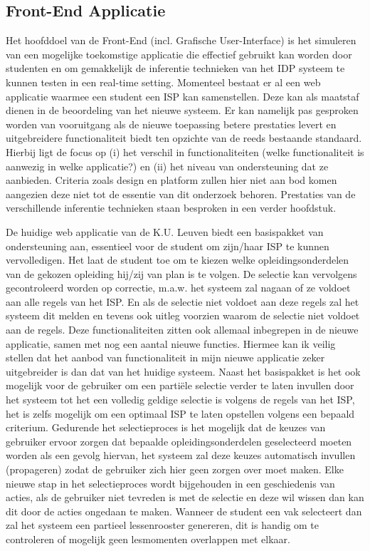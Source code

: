 \subsection{Front-End Applicatie} 
Het hoofddoel van de Front-End (incl. Grafische User-Interface) is het simuleren van een mogelijke toekomstige applicatie die effectief gebruikt kan worden door studenten en om gemakkelijk de inferentie technieken van het IDP systeem te kunnen testen in een real-time setting. Momenteel bestaat er al een web applicatie waarmee een student een ISP kan samenstellen. Deze kan als maatstaf dienen in de beoordeling van het nieuwe systeem. Er kan namelijk pas gesproken worden van vooruitgang als de nieuwe toepassing betere prestaties levert en uitgebreidere functionaliteit biedt ten opzichte van de reeds bestaande standaard. Hierbij ligt de focus op (i) het verschil in functionaliteiten (welke functionaliteit is aanwezig in welke applicatie?) en (ii) het niveau van ondersteuning dat ze aanbieden. Criteria zoals design en platform zullen hier niet aan bod komen aangezien deze niet tot de essentie van dit onderzoek behoren. Prestaties van de verschillende inferentie technieken staan besproken in een verder hoofdstuk. 

De huidige web applicatie van de K.U. Leuven biedt een basispakket van ondersteuning aan, essentieel voor de student om zijn/haar ISP te kunnen vervolledigen. Het laat de student toe om te kiezen welke opleidingsonderdelen van de gekozen opleiding hij/zij van plan is te volgen. De selectie kan vervolgens gecontroleerd worden op correctie, m.a.w. het systeem zal nagaan of ze voldoet aan alle regels van het ISP.  En als de selectie niet voldoet aan deze regels zal het systeem dit melden en tevens ook uitleg voorzien waarom de selectie niet voldoet aan de regels. Deze functionaliteiten zitten ook allemaal inbegrepen in de nieuwe applicatie, samen met nog een aantal nieuwe functies. Hiermee kan ik veilig stellen dat het aanbod van functionaliteit in mijn nieuwe applicatie zeker uitgebreider is dan dat van het huidige systeem. 
Naast het basispakket is het ook mogelijk voor de gebruiker om een parti\"{e}le selectie verder te laten invullen door het systeem tot het een volledig geldige selectie is volgens de regels van het ISP, het is zelfs mogelijk om een optimaal ISP te laten opstellen volgens een bepaald criterium. Gedurende het selectieproces is het mogelijk dat de keuzes van gebruiker ervoor zorgen dat bepaalde opleidingsonderdelen geselecteerd moeten worden als een gevolg hiervan, het systeem zal deze keuzes automatisch invullen (propageren) zodat de gebruiker zich hier geen zorgen over moet maken. Elke nieuwe stap in het selectieproces wordt bijgehouden in een geschiedenis van acties, als de gebruiker niet tevreden is met de selectie en deze wil wissen dan kan dit door de acties ongedaan te maken. Wanneer de student een vak selecteert dan zal het systeem een partieel lessenrooster genereren, dit is handig om te controleren of mogelijk geen lesmomenten overlappen met elkaar. 

